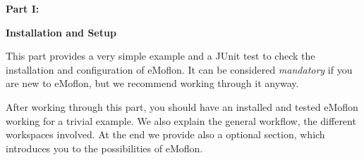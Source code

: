 {\bf \huge Part I:}
\vspace{0.7cm}
 
{\bf \Huge Installation and Setup }

\vspace{0.5cm}

This part provides a very simple example and a JUnit test to check the installation and configuration of eMoflon. It can be considered \emph{mandatory} if you
are new to eMoflon, but we recommend working through it anyway.

After working through this part, you should have an installed and tested eMoflon working for a trivial example. We also explain the general workflow, the
different workspaces involved. At the end we provide also a optional section, which introduces you to the possibilities of eMoflon.


\downloadLocation{\dlPartOne}






